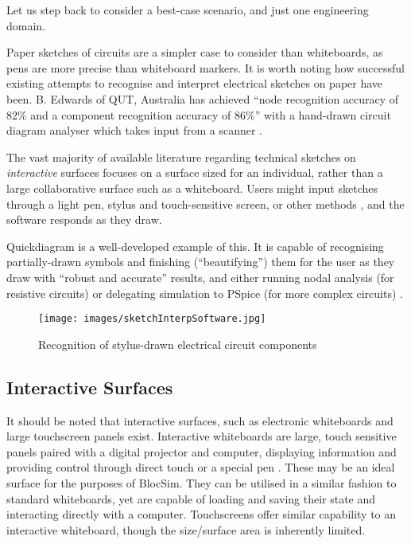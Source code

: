 Let us step back to consider a best-case scenario, and just one engineering domain. 

Paper sketches  of circuits are a simpler case to consider than whiteboards, as pens are more precise than whiteboard markers. It is worth noting how successful existing attempts to recognise and interpret electrical sketches on paper have been.
B. Edwards of QUT, Australia has achieved “node recognition accuracy of 82\% and a component recognition accuracy of 86\%” with a hand-drawn circuit diagram analyser which takes input from a scanner \cite{handDrawnCircuits}.

The vast majority of available literature regarding technical sketches on \textit{interactive} surfaces focuses on a surface sized for an individual, rather than a large collaborative surface such as a whiteboard. Users might input sketches through a light pen, stylus and touch-sensitive screen, or other methods \cite{sketchInterpSoftware}, and the software responds as they draw. 

Quickdiagram is a well-developed example of this. It is capable of recognising partially-drawn symbols and finishing (“beautifying”) them for the user as they draw with “robust and accurate” results, and either running nodal analysis (for resistive circuits) or delegating simulation to PSpice (for more complex circuits) \cite{quickDiagram}.

\begin{figure}[ht!]
\centering
\texttt{[image: images/sketchInterpSoftware.jpg]}
\caption{Recognition of stylus-drawn electrical circuit components \cite{sketchInterpSoftware}}
\label{im:sketchInterpSoftware}
\end{figure}

\clearpage


\subsection{Interactive Surfaces}

It should be noted that interactive surfaces, such as electronic whiteboards and large touchscreen panels exist. Interactive whiteboards are large, touch sensitive panels paired with a digital projector and computer, displaying information and providing control through direct touch or a special pen \cite{interactiveWhiteboards}. These may be an ideal surface for the purposes of BlocSim. They can be utilised in a similar fashion to standard whiteboards, yet are capable of loading and saving their state and interacting directly with a computer. Touchscreens offer similar capability to an interactive whiteboard, though the size/surface area is inherently limited.
\\

